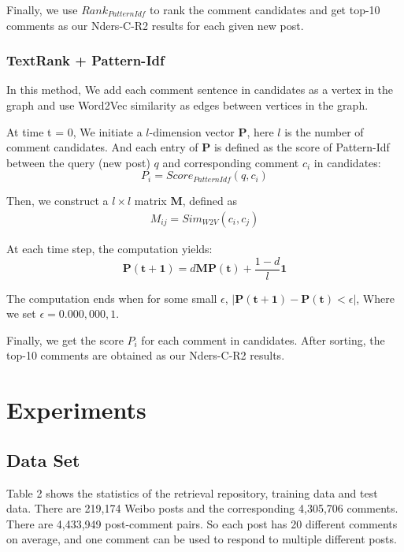\documentclass{llncs}
\begin{document}
Finally, we use $Rank_{PatternIdf}$ to rank the comment candidates and get top-10 comments as our Nders-C-R2 results for each given new post.

\subsubsection{TextRank + Pattern-Idf}
In this method, We add each comment sentence in candidates as a vertex in the 
graph and use Word2Vec similarity as edges between vertices in the graph. 

At time t = 0, We initiate a $l$-dimension vector $\bm{P}$, here $l$ is the 
number of comment candidates. And each entry of $\bm{P}$ is defined as the 
score of Pattern-Idf between the query (new post) $q$ and corresponding comment
$c_i$ in candidates:
\begin{equation}
  P_i = Score_{PatternIdf}(q, c_i)
\end{equation} 

Then, we construct a $l \times l$ matrix $\bm{M}$, defined as
\begin{equation}
  \begin{aligned}
    M_{ij} = Sim_{W2V}(c_i, c_j)
  \end{aligned}
\end{equation}

At each time step, the computation yields:
\begin{equation}
  \bm{P(t+1)} = d\bm{M}\bm{P(t)} + \frac{1-d}{l} \bm{1}
\end{equation}

The computation ends when for some small $\epsilon$, $|\bm{P(t+1)} - \bm{P(t)} < \epsilon|$, Where we set $\epsilon = 0.000,000,1$.

Finally, we get the score $P_i$ for each comment in candidates. After sorting, 
the top-10 comments are obtained as our Nders-C-R2 results.

\section{Experiments}

\subsection{Data Set}
Table 2 shows the statistics of the retrieval repository, training
data and test data. There are 219,174 Weibo posts and the
corresponding 4,305,706 comments. There are 4,433,949 post-comment
pairs. So each post has 20 different comments on
average, and one comment can be used to respond to multiple
different posts. 
\end{document}
